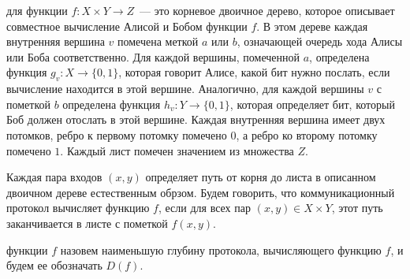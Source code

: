 
\begin{definition*}
     для функции $f: X \times Y \to Z$~--- это корневое двоичное
    дерево, которое описывает совместное вычисление Алисой и Бобом функции $f$. В этом дереве каждая
    внутренняя вершина $v$ помечена меткой $a$ или $b$, означающей очередь хода Алисы или Боба
    соответственно. Для каждой вершины, помеченной $a$, определена функция $g_v: X \to \{0, 1\}$, которая
    говорит Алисе, какой бит нужно послать, если вычисление находится в этой вершине. Аналогично, для
    каждой вершины $v$ с пометкой $b$ определена функция $h_v: Y \to \{0, 1\}$, которая определяет бит,
    который Боб должен отослать в этой вершине. Каждая внутренняя вершина имеет двух потомков, ребро к
    первому потомку помечено $0$, а ребро ко второму потомку помечено $1$. Каждый лист помечен значением
    из множества $Z$.

    Каждая пара входов $(x, y)$ определяет путь от корня до листа в описанном двоичном дереве
    естественным обрзом. Будем говорить, что коммуникационный протокол вычисляет функцию $f$, если для
    всех пар $(x, y) \in X \times Y$, этот путь заканчивается в листе с пометкой $f(x, y)$.

     функции $f$ назовем наименьшую глубину протокола, вычисляющего
    функцию $f$, и будем ее обозначать $D(f)$.
\end{definition*}


\breakline







